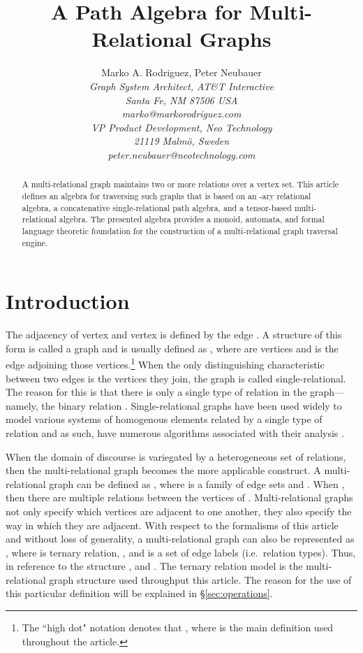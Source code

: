\documentclass[10pt,conference,letterpaper]{IEEEtran}
\title{A Path Algebra for Multi-Relational Graphs}
\author{{Marko A. Rodriguez{\small }, Peter Neubauer{\small } }\vspace{1.6mm}\\
\fontsize{10}{10}\selectfont\itshape
Graph System Architect, AT\&T Interactive\\
Santa Fe, NM 87506 USA\\
\fontsize{9}{9}\selectfont\ttfamily\upshape
marko@markorodriguez.com
\vspace{1.2mm}\\
\fontsize{10}{10}\selectfont\rmfamily\itshape
VP Product Development, Neo Technology\\
21119 Malm\"{o}, Sweden\\
\fontsize{9}{9}\selectfont\ttfamily\upshape
peter.neubauer@neotechnology.com
}
\begin{document}
\maketitle
\begin{abstract} 
A multi-relational graph maintains two or more relations over a vertex set. This article defines an algebra for traversing such graphs that is based on an -ary relational algebra, a concatenative single-relational path algebra, and a tensor-based multi-relational algebra. The presented algebra provides a monoid, automata, and formal language theoretic foundation for the construction of a multi-relational graph traversal engine.
\end{abstract}

\section{Introduction}

The adjacency of vertex  and vertex  is defined by the edge . A structure of this form is called a graph and is usually defined as , where  are vertices and  is the edge adjoining those vertices.\footnote{The ``high dot" notation denotes that , where  is the main definition used throughout the article.} When the only distinguishing characteristic between two edges is the vertices they join, the graph is called single-relational. The reason for this is that there is only a single type of relation in the graph---namely, the binary relation . Single-relational graphs have been used widely to model various systems of homogenous elements related by a single type of relation and as such, have numerous algorithms associated with their analysis \cite{netanal:brandes2005}. 

When the domain of discourse is variegated by a heterogeneous set of relations, then the multi-relational graph becomes the more applicable construct. A multi-relational graph can be defined as , where  is a family of edge sets and . When , then there are multiple relations between the vertices of . Multi-relational graphs not only specify which vertices are adjacent to one another, they also specify the way in which they are adjacent. With respect to the formalisms of this article and without loss of generality, a multi-relational graph can also be represented as , where  is ternary relation, , and  is a set of edge labels (i.e.~relation types). Thus, in reference to the structure ,  and . The ternary relation model is the multi-relational graph structure used throughput this article. The reason for the use of this particular  definition will be explained in \S \ref{sec:operations}.
\end{document}
